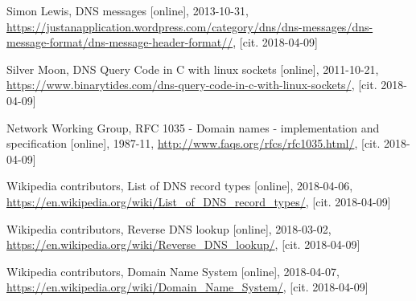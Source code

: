 \documentclass[11pt, a4paper, titlepage]{article}
\begin{document}

\newpage
\renewcommand{\refname}{Zdroje}
\begin{thebibliography}{9}

	Simon Lewis,
	DNS messages [online],
	2013-10-31,
	\url{https://justanapplication.wordpress.com/category/dns/dns-messages/dns-message-format/dns-message-header-format//},
	[cit. 2018-04-09]

	Silver Moon,
	DNS Query Code in C with linux sockets [online],
	2011-10-21,
	\url{https://www.binarytides.com/dns-query-code-in-c-with-linux-sockets/},
	[cit. 2018-04-09]

	Network Working Group,
	RFC 1035 - Domain names - implementation and specification [online],
	1987-11,
	\url{http://www.faqs.org/rfcs/rfc1035.html/},
	[cit. 2018-04-09]

	Wikipedia contributors,
	List of DNS record types [online],
	2018-04-06,
	\url{https://en.wikipedia.org/wiki/List_of_DNS_record_types/},
	[cit. 2018-04-09]

	Wikipedia contributors,
	Reverse DNS lookup [online],
	2018-03-02,
	\url{https://en.wikipedia.org/wiki/Reverse_DNS_lookup/},
	[cit. 2018-04-09]

	Wikipedia contributors,
	Domain Name System [online],
	2018-04-07,
	\url{https://en.wikipedia.org/wiki/Domain_Name_System/},
	[cit. 2018-04-09]

\end{thebibliography}

\end{document}

